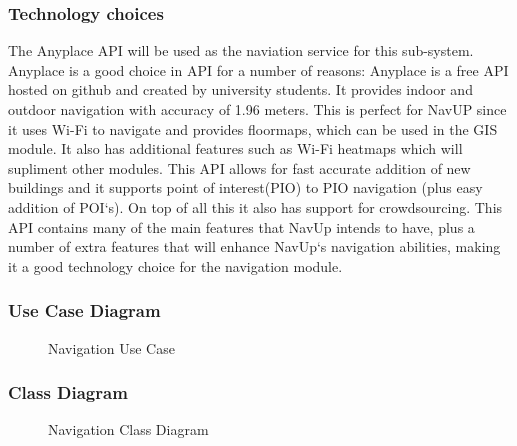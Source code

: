  
  
\subsubsection{Technology choices}
	The Anyplace API will be used as the naviation service for this sub-system. Anyplace is a good 
	choice in API for a number of reasons: Anyplace is a free API hosted on github and created by 
	university students. It provides indoor and outdoor navigation with accuracy of 1.96 meters. 
	This is perfect for NavUP since it uses Wi-Fi to navigate and provides floormaps, which can be 
	used in the GIS module. It also has additional features such as Wi-Fi heatmaps which will 
	supliment other modules. This API allows for fast accurate addition of new buildings and it 
	supports point of interest(PIO) to PIO navigation (plus easy addition of POI`s). On top of all 
	this it also has support for crowdsourcing. This API contains many of the main features that NavUp
	 intends to have, plus a number of extra features that will enhance NavUp`s navigation abilities,
	  making it a good technology choice for the navigation module.

\subsubsection{Use Case Diagram}
	\begin{figure}[h!]
	\caption{Navigation Use Case}
	\end{figure}

\subsubsection{Class Diagram}
	\begin{figure}[h!]
	\caption{Navigation Class Diagram}
	\end{figure}

